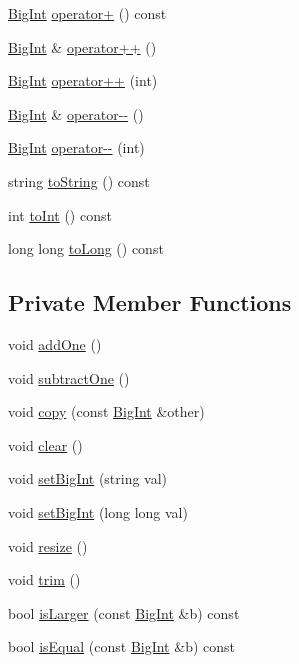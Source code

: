 \begin{DoxyCompactItemize}
\item 
\hyperlink{class_big_int}{Big\+Int} \hyperlink{class_big_int_a6aca3cff26d5c67d4189139b95b53e32}{operator+} () const 
\item 
\hyperlink{class_big_int}{Big\+Int} \& \hyperlink{class_big_int_a0f1a8a43867f25c8df48e7747012536f}{operator++} ()
\item 
\hyperlink{class_big_int}{Big\+Int} \hyperlink{class_big_int_a7120696c07c413340246a61eb209a541}{operator++} (int)
\item 
\hyperlink{class_big_int}{Big\+Int} \& \hyperlink{class_big_int_aed992537fac59f8c794fc24d10baf199}{operator-\/-\/} ()
\item 
\hyperlink{class_big_int}{Big\+Int} \hyperlink{class_big_int_a6ef5639e9f2cb2226f8611bb39c6c663}{operator-\/-\/} (int)
\item 
string \hyperlink{class_big_int_a947ea3d85937c212c75f58da26e41d00}{to\+String} () const 
\item 
int \hyperlink{class_big_int_a8c5832ca4c93be36a01a0683ed9b9d87}{to\+Int} () const 
\item 
long long \hyperlink{class_big_int_a1a6a8a6deeda3f57b27566027e3c2d4d}{to\+Long} () const 
\end{DoxyCompactItemize}
\subsection*{Private Member Functions}
\begin{DoxyCompactItemize}
\item 
void \hyperlink{class_big_int_a061d5ed012a04d6646c9a6a0e10da544}{add\+One} ()
\item 
void \hyperlink{class_big_int_a4baef860c6adb34f670a868db7fc4482}{subtract\+One} ()
\item 
void \hyperlink{class_big_int_a2881bf9fd6f9310cef0853036d89f8a1}{copy} (const \hyperlink{class_big_int}{Big\+Int} \&other)
\item 
void \hyperlink{class_big_int_a1509ac3f5654b5b39c5f499b68a094dd}{clear} ()
\item 
void \hyperlink{class_big_int_a896d3c59d3c4f1e0435d21b2bf50169f}{set\+Big\+Int} (string val)
\item 
void \hyperlink{class_big_int_a2344433f6a07aa0dec0e2f0b2db811b8}{set\+Big\+Int} (long long val)
\item 
void \hyperlink{class_big_int_a4d6ffd94b538c45fa3c4c02e625ba7b7}{resize} ()
\item 
void \hyperlink{class_big_int_a292c19c73cf1198bfb3f64ca093651d2}{trim} ()
\item 
bool \hyperlink{class_big_int_a0963adebab02961555382704df42d708}{is\+Larger} (const \hyperlink{class_big_int}{Big\+Int} \&b) const 
\item 
bool \hyperlink{class_big_int_a5429df4fc70cb4f4af675d4d64280f71}{is\+Equal} (const \hyperlink{class_big_int}{Big\+Int} \&b) const 
\end{DoxyCompactItemize}
